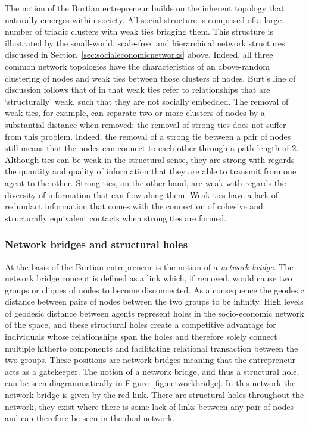 The notion of the Burtian entrepreneur builds on the inherent topology that naturally emerges within society. All social structure is comprised of a large number of triadic clusters with weak ties bridging them. This structure is illustrated by the small-world, scale-free, and hierarchical network structures discussed in Section~\ref{sec:socialeconomicnetworks} above. Indeed, all three common network topologies have the characteristics of an above-random clustering of nodes and weak ties between those clusters of nodes. Burt's line of discussion follows that of \citet{Granovetter1973} in that weak ties refer to relationships that are `structurally' weak, such that they are not socially embedded. The removal of weak ties, for example, can separate two or more clusters of nodes by a substantial distance when removed; the removal of strong ties does not suffer from this problem. Indeed, the removal of a strong tie between a pair of nodes still means that the nodes can connect to each other through a path length of 2. Although ties can be weak in the structural sense, they are strong with regards the quantity and quality of information that they are able to transmit from one agent to the other. Strong ties, on the other hand, are weak with regards the diversity of information that can flow along them. Weak ties have a lack of redundant information that comes with the connection of cohesive and structurally equivalent contacts when strong ties are formed.

\subsubsection{Network bridges and structural holes}

At the basis of the Burtian entrepreneur is the notion of a \emph{network bridge}. The network bridge concept is defined as a link which, if removed, would cause two groups or cliques of nodes to become disconnected. As a consequence the geodesic distance between pairs of nodes between the two groups to be infinity. High levels of geodesic distance between agents represent holes in the socio-economic network of the space, and these structural holes create a competitive advantage for individuals whose relationships span the holes and therefore solely connect multiple hitherto components and facilitating relational transaction between the two groups. These positions are network bridges meaning that the entrepreneur acts as a gatekeeper. The notion of a network bridge, and thus a structural hole, can be seen diagrammatically in Figure~\ref{fig:networkbridge}. In this network the network bridge is given by the red link. There are structural holes throughout the network, they exist where there is some lack of links between any pair of nodes and can therefore be seen in the dual network.


